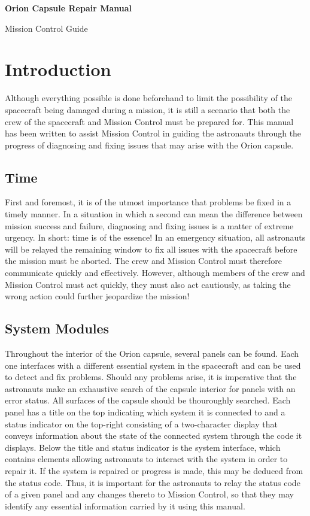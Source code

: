 \documentclass[12pt,draft]{article}
\begin{document}
\begin{titlepage}
 \thispagestyle{empty}
 \centering
 \rmfamily
 {\Huge\bfseries Orion Capsule Repair Manual\par}
 \vspace{1cm}
 {\Large Mission Control Guide}
 \vfill
\end{titlepage}

\section*{Introduction}

Although everything possible is done beforehand to limit the possibility of the spacecraft being damaged during a mission, it is still a scenario that both the crew of the spacecraft and Mission Control must be prepared for. This manual has been written to assist Mission Control in guiding the astronauts through the progress of diagnosing and fixing issues that may arise with the Orion capsule.

\subsection*{Time}

First and foremost, it is of the utmost importance that problems be fixed in a timely manner. In a situation in which a second can mean the difference between mission success and failure, diagnosing and fixing issues is a matter of extreme urgency. In short: time is of the essence! In an emergency situation, all astronauts will be relayed the remaining window to fix all issues with the spacecraft before the mission must be aborted. The crew and Mission Control must therefore communicate quickly and effectively. However, although members of the crew and Mission Control must act quickly, they must also act cautiously, as taking the wrong action could further jeopardize the mission!

\subsection*{System Modules}

Throughout the interior of the Orion capsule, several panels can be found. Each one interfaces with a different essential system in the spacecraft and can be used to detect and fix problems. Should any problems arise, it is imperative that the astronauts make an exhaustive search of the capsule interior for panels with an error status. All surfaces of the capsule should be thouroughly searched. Each panel has a title on the top indicating which system it is connected to and a status indicator on the top-right consisting of a two-character display that conveys information about the state of the connected system through the code it displays. Below the title and status indicator is the system interface, which contains elements allowing astronauts to interact with the system in order to repair it. If the system is repaired or progress is made, this may be deduced from the status code. Thus, it is important for the astronauts to relay the status code of a given panel and any changes thereto to Mission Control, so that they may identify any essential information carried by it using this manual.
\end{document}
